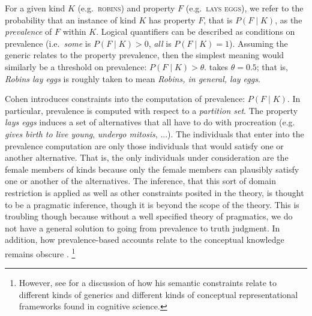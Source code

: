 \documentclass[12pt,letterpaper]{article}
\begin{document}
For a given kind $K$ (e.g.~\textsc{robins}) and property $F$ (e.g.~\textsc{lays eggs}), we refer to the probability that an instance of kind $K$ has property $F$, that is $P(F\mid K)$, as the \emph{prevalence} of $F$ within $K$.
Logical quantifiers can be described as conditions on prevalence (i.e.~\emph{some} is $P(F\mid K)>0$, \emph{all} is $P(F\mid K)=1$). 
Assuming the generic relates to the property prevalence, then the simplest meaning would similarly be a threshold on prevalence: $P(F\mid K)>\theta$.  takes $\theta = 0.5$; that is, \emph{Robins lay eggs} is roughly taken to mean \emph{Robins, in general, lay eggs}. 

Cohen introduces constraints into the computation of prevalence: $P(F\mid K)$. In particular, prevalence is computed with respect to a \emph{partition set}. 
The property \emph{lays eggs} induces a set of alternatives that all have to do with procreation (e.g. \emph{gives birth to live young}, \emph{undergo mitosis}, ...).
The individuals that enter into the prevalence computation are only those individuals that would satisfy one or another alternative. 
That is, the only individuals under consideration are the female members of kinds because only the female members can plausibly satisfy one or another of the alternatives.
The inference, that this sort of domain restriction is applied as well as other constraints posited in the theory, is thought to be a pragmatic inference, though it is beyond the scope of the theory.
This is troubling though because without a well specified theory of pragmatics, we do not have a general solution to going from prevalence to truth judgment.
In addition, how prevalence-based accounts relate to the conceptual knowledge remains obscure \cite{Carlson1995essay}.
\footnote{However, see  for a discussion of how his semantic constraints relate to different kinds of generics and different kinds of conceptual representational frameworks found in cognitive science.}

\end{document}

